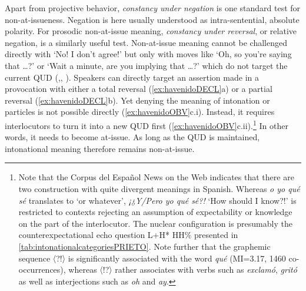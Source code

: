 Apart from projective behavior, \textit{constancy under negation} is one standard test for non-at-issueness. Negation is here usually understood as intra-sentential, absolute polarity. For prosodic non-at-issue meaning, \textit{constancy under reversal}, or relative negation, is a similarly useful test. Non-at-issue meaning cannot be challenged directly with `No! I don't agree!' but only with moves like `Oh, so you're saying that \ldots?' or `Wait a minute, are you implying that \ldots?' which do not target the current \ac{QUD} (\cite[2521]{Potts.2012},\cite{Taniguchi.2017}, \cite[259]{Westera.2017}). Speakers can directly target an assertion made in a provocation with either a total reversal (\ref{ex:havenidoDECL}a) or a partial reversal (\ref{ex:havenidoDECL}b). Yet denying the meaning of intonation or particles is not possible directly (\ref{ex:havenidoOBV}c.i). Instead, it requires interlocutors to turn it into a new \ac{QUD} first (\ref{ex:havenidoOBV}c.ii).\footnote{Note that the Corpus del Español News on the Web \citep{Davies.20122019} indicates that there are two construction with quite divergent meanings in Spanish. Whereas \textit{o yo qué sé} translates to `or whatever', \textit{¡¿Y/Pero yo qué sé?!} `How should I know?!' is restricted to contexts rejecting an assumption of expectability or knowledge on the part of the interlocutor. The nuclear configuration is presumably the counterexpectational echo question L+H* HH\% presented in \autoref{tab:intonationalcategoriesPRIETO}. Note further that the graphemic sequence 〈?!〉 is significantly associated with the word \textit{qué} (MI=3.17, 1460 co-occurrences), whereas 〈!?〉 rather associates with verbs such as \textit{exclamó}, \textit{gritó} as well as interjections such as \textit{oh} and \textit{ay}.} In other words, it needs to become at-issue. As long as the \ac{QUD} is maintained, intonational meaning therefore remains non-at-issue.\largerpage[2]


